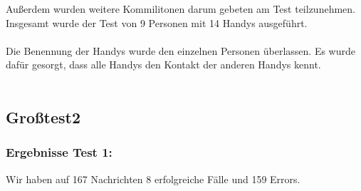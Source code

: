Außerdem wurden weitere Kommilitonen darum gebeten am Test teilzunehmen.
Insgesamt wurde der Test von 9 Personen mit 14 Handys ausgeführt.\\\\

Die Benennung der Handys wurde den einzelnen Personen überlassen. Es
wurde dafür gesorgt, dass alle Handys den Kontakt der anderen Handys
kennt.\\\\

\subsection{Großtest2}\label{großtest-2}
\subsubsection{Ergebnisse Test 1:}\label{ergebnisse-test-1-1}

Wir haben auf 167 Nachrichten 8 erfolgreiche Fälle und 159 Errors.

